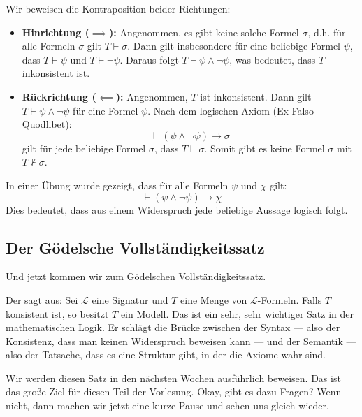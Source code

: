 \begin{math-stroke}

\begin{short-proof}
Wir beweisen die Kontraposition beider Richtungen:
\begin{itemize}
    \item \textbf{Hinrichtung ($\implies$):} Angenommen, es gibt keine solche Formel $\sigma$, d.h. für alle Formeln $\sigma$ gilt $T \vdash \sigma$. Dann gilt insbesondere für eine beliebige Formel $\psi$, dass $T \vdash \psi$ und $T \vdash \neg \psi$. Daraus folgt $T \vdash \psi \land \neg \psi$, was bedeutet, dass $T$ inkonsistent ist.
    \item \textbf{Rückrichtung ($\impliedby$):} Angenommen, $T$ ist inkonsistent. Dann gilt $T \vdash \psi \land \neg \psi$ für eine Formel $\psi$. Nach dem logischen Axiom (Ex Falso Quodlibet):
    \[ \vdash (\psi \land \neg \psi) \rightarrow \sigma \]
    gilt für jede beliebige Formel $\sigma$, dass $T \vdash \sigma$. Somit gibt es keine Formel $\sigma$ mit $T \not\vdash \sigma$.
\end{itemize}
\end{short-proof}

\begin{remark}
In einer Übung wurde gezeigt, dass für alle Formeln $\psi$ und $\chi$ gilt:
\[ \vdash (\psi \land \neg \psi) \rightarrow \chi \]
Dies bedeutet, dass aus einem Widerspruch jede beliebige Aussage logisch folgt.
\end{remark}
\end{math-stroke}

\subsection{Der Gödelsche Vollständigkeitssatz}
\begin{spoken-clean}[00:28:32 - 00:31:10]
Und jetzt kommen wir zum Gödelschen Vollständigkeitssatz.

Der sagt aus: Sei $\mathcal{L}$ eine Signatur und $T$ eine Menge von $\mathcal{L}$-Formeln. Falls $T$ konsistent ist, so besitzt $T$ ein Modell. Das ist ein sehr, sehr wichtiger Satz in der mathematischen Logik. Er schlägt die Brücke zwischen der Syntax --- also der Konsistenz, dass man keinen Widerspruch beweisen kann --- und der Semantik --- also der Tatsache, dass es eine Struktur gibt, in der die Axiome wahr sind.

Wir werden diesen Satz in den nächsten Wochen ausführlich beweisen. Das ist das große Ziel für diesen Teil der Vorlesung. Okay, gibt es dazu Fragen? Wenn nicht, dann machen wir jetzt eine kurze Pause und sehen uns gleich wieder.
\end{spoken-clean}

